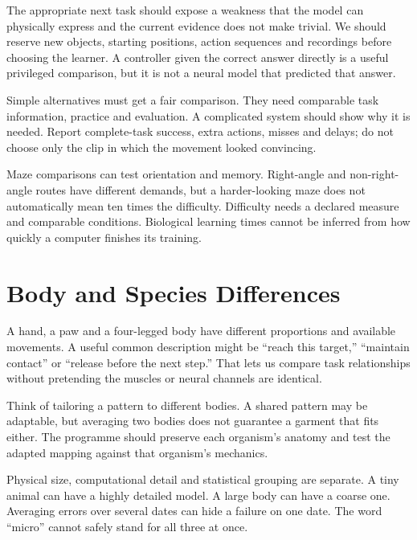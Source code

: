 The appropriate next task should expose a weakness that the model can physically express and the current evidence does not make trivial. We should reserve new objects, starting positions, action sequences and recordings before choosing the learner. A controller given the correct answer directly is a useful privileged comparison, but it is not a neural model that predicted that answer.\par

Simple alternatives must get a fair comparison. They need comparable task information, practice and evaluation. A complicated system should show why it is needed. Report complete-task success, extra actions, misses and delays; do not choose only the clip in which the movement looked convincing.\par

Maze comparisons can test orientation and memory. Right-angle and non-right-angle routes have different demands, but a harder-looking maze does not automatically mean ten times the difficulty. Difficulty needs a declared measure and comparable conditions. Biological learning times cannot be inferred from how quickly a computer finishes its training.\par

\section{Body and Species Differences}

A hand, a paw and a four-legged body have different proportions and available movements. A useful common description might be ``reach this target,'' ``maintain contact'' or ``release before the next step.'' That lets us compare task relationships without pretending the muscles or neural channels are identical.\par

Think of tailoring a pattern to different bodies. A shared pattern may be adaptable, but averaging two bodies does not guarantee a garment that fits either. The programme should preserve each organism's anatomy and test the adapted mapping against that organism's mechanics.\par

Physical size, computational detail and statistical grouping are separate. A tiny animal can have a highly detailed model. A large body can have a coarse one. Averaging errors over several dates can hide a failure on one date. The word ``micro'' cannot safely stand for all three at once.\par

